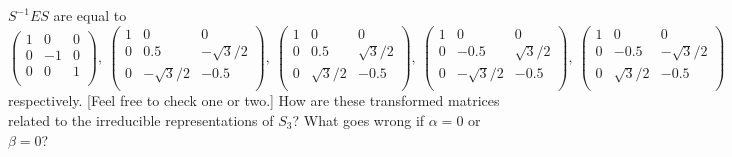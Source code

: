 \documentclass[a4paper]{article}
\begin{document}
\begin{qns}
$S^{−1}ES$ are equal to
$$\begin{pmatrix}1&0&0\\0&-1&0\\0&0&1\\\end{pmatrix},~\begin{pmatrix}1&0&0\\0&0.5&-\sqrt{3}/2\\0&-\sqrt{3}/2&-0.5\\\end{pmatrix},~\begin{pmatrix}1&0&0\\0&0.5&\sqrt{3}/2\\0&\sqrt{3}/2&-0.5\\\end{pmatrix},~\begin{pmatrix}1&0&0\\0&-0.5&\sqrt{3}/2\\0&-\sqrt{3}/2&-0.5\\\end{pmatrix},~\begin{pmatrix}1&0&0\\0&-0.5&-\sqrt{3}/2\\0&\sqrt{3}/2&-0.5\\\end{pmatrix}$$
respectively. [Feel free to check one or two.] How are these transformed matrices related to the irreducible representations of $S_3$? What goes wrong if $\alpha=0$ or $\beta=0$?
\end{qns}
\end{document}
